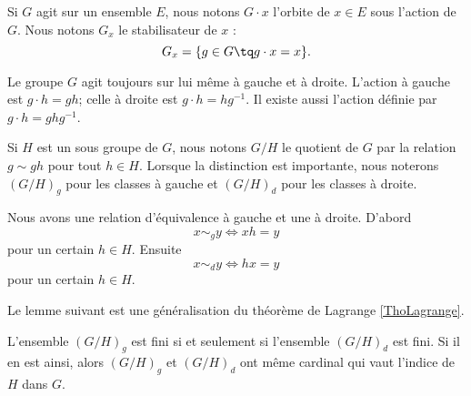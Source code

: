 Si \( G\) agit sur un ensemble \( E\), nous notons \( G\cdot x\) l'orbite de \( x\in E\) sous l'action de $G$. Nous notons \( G_x\) le stabilisateur de \( x\) :
\begin{equation}
    G_x=\{ g\in G\tq g\cdot x=x \}.
\end{equation}

Le groupe \( G\) agit toujours sur lui même à gauche et à droite. L'action à gauche est \( g\cdot h=gh\); celle à droite est \( g\cdot h=hg^{-1}\). Il existe aussi l'action  définie par \( g\cdot h=ghg^{-1}\).

Si \( H\) est un sous groupe de  \( G\), nous notons \( G/H\) le quotient de $G$ par la relation \( g\sim gh\) pour tout \( h\in H\). Lorsque la distinction est importante, nous noterons \( (G/H)_g\) pour les classes à gauche et \( (G/H)_d\) pour les classes à droite.

Nous avons une relation d'équivalence à gauche et une à droite. D'abord
\begin{equation}
    x\sim_g y\Leftrightarrow xh=y
\end{equation}
pour un certain \( h\in H\). Ensuite
\begin{equation}
    x\sim_d y\Leftrightarrow hx=y
\end{equation}
pour un certain \( h\in H\). 

Le lemme suivant est une généralisation du théorème de Lagrange \ref{ThoLagrange}.

\begin{lemma}
    L'ensemble \( (G/H)_g\) est fini si et seulement si l'ensemble \( (G/H)_d\) est fini. Si il en est ainsi, alors \( (G/H)_g\) et \( (G/H)_d\) ont même cardinal qui vaut l'indice de \( H\) dans \( G\).
\end{lemma}

